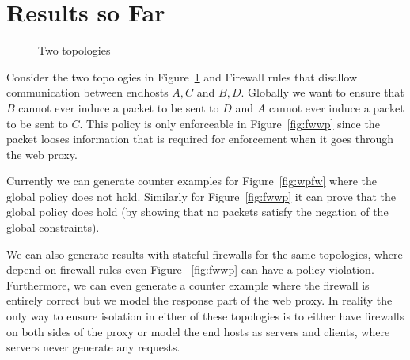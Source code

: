\documentclass[11pt]{article}
\begin{document}
{\section{Results so Far}
\begin{figure}[!h]
\begin{center}
\caption{Two topologies}
\label{fig:topologies}
\end{center}
\end{figure}
Consider the two topologies in Figure~\ref{fig:topologies} and Firewall rules that disallow communication between
endhosts $A, C$ and $B, D$. Globally we want to ensure that $B$ cannot ever induce a packet to be sent to $D$ and $A$
cannot ever induce a packet to be sent to $C$. This policy is only enforceable in Figure~\ref{fig:fwwp} since the packet
looses information that is required for enforcement when it goes through the web proxy.

Currently we can generate counter examples for Figure~\ref{fig:wpfw} where the global policy does
not hold. Similarly for Figure~\ref{fig:fwwp} it can prove that the global policy does hold (by showing that no packets
satisfy the negation of the global constraints). 

We can also generate results with stateful firewalls for the same topologies, where depend on firewall rules even Figure
~\ref{fig:fwwp} can have a policy violation. Furthermore, we can even generate a counter example where the firewall is entirely 
correct but we model the response part of the web proxy. In reality the only way to ensure isolation in either of these
topologies is to either have firewalls on both sides of the proxy or model the end hosts as servers and clients, where servers
never generate any requests.

}
\end{document}
